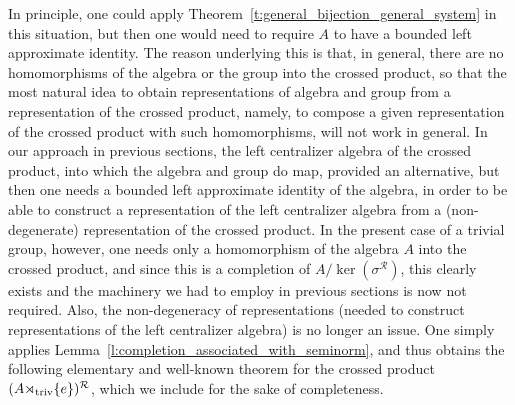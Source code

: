 \documentclass{amsart}
\theoremstyle{plain}
\theoremstyle{definition}
\numberwithin{equation}{section}
\begin{document}
In principle, one could apply Theorem~\ref{t:general_bijection_general_system} in this situation, but then one would need to require $A$ to have a bounded left approximate identity. The reason underlying this is that, in general, there are no homomorphisms of the algebra or the group into the crossed product, so that the most natural idea to obtain representations of algebra and group from a representation of the crossed product, namely, to compose a given representation of the crossed product with such homomorphisms, will not work in general. In our approach in previous sections, the left centralizer algebra of the crossed product, into which the algebra and group do map, provided an alternative, but then one needs a bounded left approximate identity of the algebra, in order to be able to construct a representation of the left centralizer algebra from a (non-degenerate) representation of the crossed product. In the present case of a trivial group, however, one needs only a homomorphism of the algebra $A$ into the crossed product, and since this is a completion of $A / \ker({\sigma^{\mathcal R}})$, this clearly exists and the machinery we had to employ in previous sections is now not required. Also, the non-degeneracy of representations (needed to construct representations of the left centralizer algebra) is no longer an issue. One simply applies Lemma~\ref{l:completion_associated_with_seminorm}, and thus obtains the following elementary and well-known theorem for the crossed product $(A {\rtimes}_{\textup{triv}} \{e\})^{\mathcal R}$, which we include for the sake of completeness.
\end{document}
